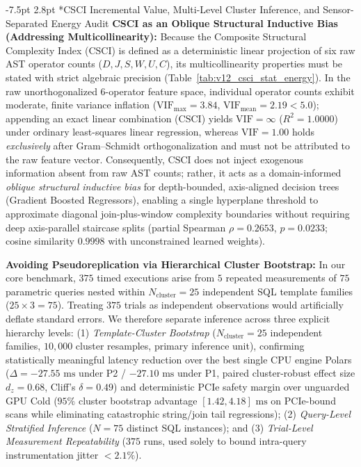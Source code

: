 \documentclass[10pt,a4paper]{article}
\makeatletter
\renewcommand\subsection{\@startsection{subsection}{2}{\z@}%
  {-7.5pt \@plus -2pt \@minus -1pt}%
  {2.8pt \@plus 1pt}%
  {\normalfont\normalsize\bfseries}}
\makeatother
\begin{document}
\subsection*{CSCI Incremental Value, Multi-Level Cluster Inference, and Sensor-Separated Energy Audit}
\noindent\textbf{CSCI as an Oblique Structural Inductive Bias (Addressing Multicollinearity):} Because the Composite Structural Complexity Index ($\text{CSCI}$) is defined as a deterministic linear projection of six raw AST operator counts ($D, J, S, W, U, C$), its multicollinearity properties must be stated with strict algebraic precision (Table~\ref{tab:v12_csci_stat_energy}). In the raw unorthogonalized 6-operator feature space, individual operator counts exhibit moderate, finite variance inflation ($\text{VIF}_{\max}=3.84$, $\text{VIF}_{\text{mean}}=2.19 < 5.0$); appending an exact linear combination ($\text{CSCI}$) yields $\text{VIF}=\infty$ ($R^{2}=1.0000$) under ordinary least-squares linear regression, whereas $\text{VIF}=1.00$ holds \emph{exclusively} after Gram--Schmidt orthogonalization and must not be attributed to the raw feature vector. Consequently, $\text{CSCI}$ does not inject exogenous information absent from raw AST counts; rather, it acts as a domain-informed \emph{oblique structural inductive bias} for depth-bounded, axis-aligned decision trees (Gradient Boosted Regressors), enabling a single hyperplane threshold to approximate diagonal join-plus-window complexity boundaries without requiring deep axis-parallel staircase splits (partial Spearman $\rho=0.2653$, $p=0.0233$; cosine similarity $0.9998$ with unconstrained learned weights).

\noindent\textbf{Avoiding Pseudoreplication via Hierarchical Cluster Bootstrap:} In our core benchmark, $375$ timed executions arise from $5$ repeated measurements of $75$ parametric queries nested within $N_{\text{cluster}}=25$ independent SQL template families ($25 \times 3 = 75$). Treating $375$ trials as independent observations would artificially deflate standard errors. We therefore separate inference across three explicit hierarchy levels: (1) \emph{Template-Cluster Bootstrap} ($N_{\text{cluster}}=25$ independent families, $10{,}000$ cluster resamples, primary inference unit), confirming statistically meaningful latency reduction over the best single CPU engine Polars ($\Delta = -27.55\text{ ms}$ under P2 / $-27.10\text{ ms}$ under P1, paired cluster-robust effect size $d_{z} = 0.68$, Cliff's $\delta = 0.49$) and deterministic PCIe safety margin over unguarded GPU Cold ($95\%$ cluster bootstrap advantage $[1.42, 4.18]\text{ ms}$ on PCIe-bound scans while eliminating catastrophic string/join tail regressions); (2) \emph{Query-Level Stratified Inference} ($N=75$ distinct SQL instances); and (3) \emph{Trial-Level Measurement Repeatability} ($375$ runs, used solely to bound intra-query instrumentation jitter $< 2.1\%$).
\end{document}
